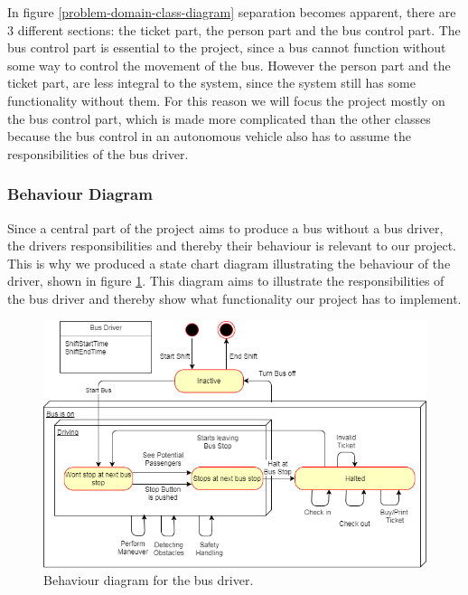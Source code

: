 In figure \ref{problem-domain-class-diagram} separation becomes apparent, there are 3 different sections: the ticket part, the person part and the bus control part. The bus control part is essential to the project, since a bus cannot function without some way to control the movement of the bus. However the person part and the ticket part, are less integral to the system, since the system still has some functionality without them. For this reason we will focus the project mostly on the bus control part, which is made more complicated than the other classes because the bus control in an autonomous vehicle also has to assume the responsibilities of the bus driver.


\subsubsection{Behaviour Diagram}

Since a central part of the project aims to produce a bus without a bus driver, the drivers responsibilities and thereby their behaviour is relevant to our project. This is why we produced a state chart diagram illustrating the behaviour of the driver, shown in figure \ref{BehaviorDiagramBusDriver}. This diagram aims to illustrate the responsibilities of the bus driver and thereby show what functionality our project has to implement.

\begin{figure}[H]
\centering
\includegraphics[scale=0.6]{Images/BehaviorDiagramBusDriver.png}
\caption{Behaviour diagram for the bus driver.}
\label{BehaviorDiagramBusDriver}
\end{figure}

